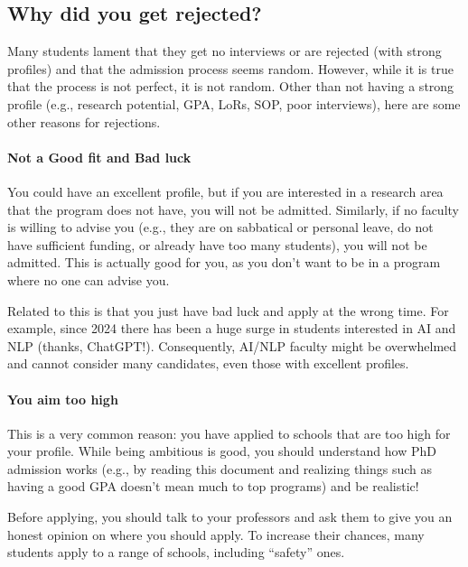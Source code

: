 \documentclass[oneside,11pt,dvipsnames]{book}
\def\sectioninfo#1{%
  \addcontentsline{toc}{sectioninfo}{%
    \noexpand\numberline{}\color{black}{#1}}%
}
\begin{document}
\subsection{Why did you get rejected?}\label{sec:why-rejected}

\sectioninfo{You aim too high, are overqualified, or even because you applied to AI/ML, a super competitive field in recent years with many applicants.}

Many students lament that they get no interviews or are rejected (with strong profiles) and that the admission process seems random.  However, while it is true that the process is not perfect, it is not random.
Other than not having a strong profile (e.g., research potential, GPA, LoRs, SOP, poor interviews), here are some other reasons for rejections.


\paragraph{Not a Good fit and Bad luck}  You could have an excellent profile, but if you are interested in a research area that the program does not have, you will not be admitted.
Similarly, if no faculty is willing to advise you (e.g., they are on sabbatical or personal leave, do not have sufficient funding, or already have too many students), you will not be admitted.  This is actually good for you, as you don't want to be in a program where no one can advise you.

Related to this is that you just have bad luck and apply at the wrong time.  For example, since 2024 there has been a huge surge in students interested in AI and NLP (thanks, ChatGPT!). Consequently, AI/NLP faculty might be overwhelmed and cannot consider many candidates, even those with excellent profiles.


\paragraph{You aim too high} This is a very common reason: you have applied to schools that are too high for your profile. While being ambitious is good, you should understand how PhD admission works (e.g., by reading this document and realizing things such as having a good GPA doesn't mean much to top programs) and be realistic! 

Before applying, you should talk to your professors and ask them to give you an honest opinion on where you should apply. To increase their chances, many students apply to a range of schools, including ``safety'' ones. 
\end{document}
